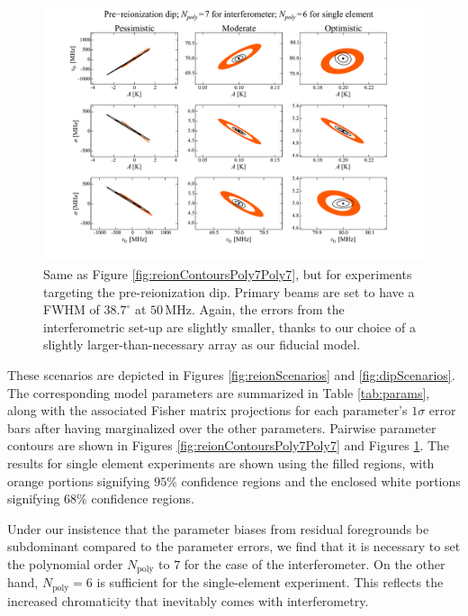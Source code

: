 \documentclass[twocolumn,apj,numberedappendix]{emulateapj}
\begin{document}
\begin{figure}[t]
	\centering
	\includegraphics[width=1.00\textwidth,trim=3cm 2cm 3cm 0cm,clip]{figures/dipContoursPoly7Poly6.pdf}
	\caption{Same as Figure \ref{fig:reionContoursPoly7Poly7}, but for experiments targeting the pre-reionization dip. Primary beams are set to have a FWHM of $38.7^\circ$ at $50\,\textrm{MHz}$. Again, the errors from the interferometric set-up are slightly smaller, thanks to our choice of a slightly larger-than-necessary array as our fiducial model.}
	\label{fig:dipContoursPoly7Poly7}
\end{figure}

These scenarios are depicted in Figures \ref{fig:reionScenarios} and  \ref{fig:dipScenarios}. The corresponding model parameters are summarized in Table \ref{tab:params}, along with the associated Fisher matrix projections for each parameter's $1\sigma$ error bars after having marginalized over the other parameters. Pairwise parameter contours are shown in Figures \ref{fig:reionContoursPoly7Poly7} and Figures \ref{fig:dipContoursPoly7Poly7}. The results for single element experiments are shown using the filled regions, with orange portions signifying $95\%$ confidence regions and the enclosed white portions signifying $68\%$ confidence regions.

Under our insistence that the parameter biases from residual foregrounds be subdominant compared to the parameter errors, we find that it is necessary to set the polynomial order $N_\textrm{poly}$ to $7$ for the case of the interferometer. On the other hand, $N_\textrm{poly}=6$ is sufficient for the single-element experiment. This reflects the increased chromaticity that inevitably comes with interferometry.
\end{document}
